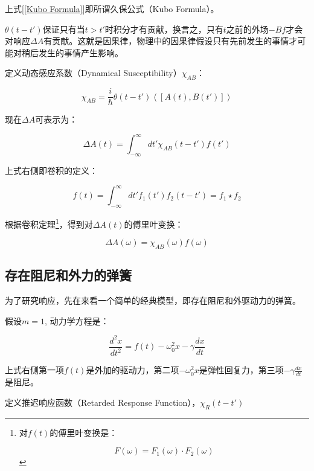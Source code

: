 上式[\ref{Kubo Formula}]即所谓久保公式（Kubo Formula）。

$\theta(t - t')$保证只有当$t > t'$时积分才有贡献，换言之，只有$t$之前的外场$-Bf$才会对响应$\Delta A$有贡献。这就是因果律，物理中的因果律假设只有先前发生的事情才可能对稍后发生的事情产生影响。

定义动态感应系数（Dynamical Susceptibility）$\chi_{AB}$：

\begin{equation}
\chi_{AB} = \frac{i}{\hbar}  \theta(t - t') \left\langle [A(t) , B(t')] \right\rangle
\end{equation}

现在$\Delta A$可表示为：

\begin{equation}
\Delta A(t) = \int_{-\infty}^{\infty} dt' \chi_{AB}(t - t') f(t')
\end{equation}

上式右侧即卷积的定义：

\begin{equation}
f(t) = \int_{-\infty}^{\infty} dt' f_1(t') f_2(t-t') = f_1 \star f_2
\end{equation}

根据卷积定理\footnote{对$f(t)$的傅里叶变换是：

\begin{equation*}
F(\omega) = F_1(\omega) \cdot F_2(\omega)
\end{equation*}}，得到对$\Delta A (t)$的傅里叶变换：

\begin{equation}
\Delta A (\omega) = \chi_{AB}(\omega) f(\omega)
\end{equation}


\subsection{存在阻尼和外力的弹簧}

为了研究响应，先在来看一个简单的经典模型，即存在阻尼和外驱动力的弹簧。

假设$m=1$, 动力学方程是：

\begin{equation}
\frac{d^2 x}{d t^2}= f(t) - \omega_0^2 x - \gamma \frac{dx}{dt} 
\end{equation}

上式右侧第一项$f(t)$是外加的驱动力，第二项$-\omega_0^2 x$是弹性回复力，第三项$-\gamma \frac{dx}{dt}$是阻尼。

定义推迟响应函数（Retarded Response Function），$\chi_R(t-t')$

